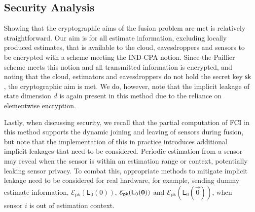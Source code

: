 % 
% 

\subsection{Security Analysis}\label{subsec:cloud_fusion:secfci2_security}
Showing that the cryptographic aims of the fusion problem are met is relatively straightforward. Our aim is for all estimate information, excluding locally produced estimates, that is available to the cloud, eavesdroppers and sensors to be encrypted with a scheme meeting the IND-CPA notion. Since the Paillier scheme meets this notion and all transmitted information is encrypted, and noting that the cloud, estimators and eavesdroppers do not hold the secret key $\mathsf{sk}$, the cryptographic aim is met. We do, however, note that the implicit leakage of state dimension $d$ is again present in this method due to the reliance on elementwise encryption.

Lastly, when discussing security, we recall that the partial computation of FCI in this method supports the dynamic joining and leaving of sensors during fusion, but note that the implementation of this in practice introduces additional implicit leakages that need to be considered. Periodic estimation from a sensor may reveal when the sensor is within an estimation range or context, potentially leaking sensor privacy. To combat this, appropriate methods to mitigate implicit leakage need to be considered for real hardware, for example, sending dummy estimate information, $\mathcal{E}_{\mathsf{pk}}(\mathsf{E}_0(0))$, $\mathcal{E}_{\mathsf{pk}}(\mathsf{E}_0({{\mathbf{0}}}))$ and $\mathcal{E}_{\mathsf{pk}}(\mathsf{E}_0(\vec{0}))$, when sensor $i$ is out of estimation context.

% 
% 


